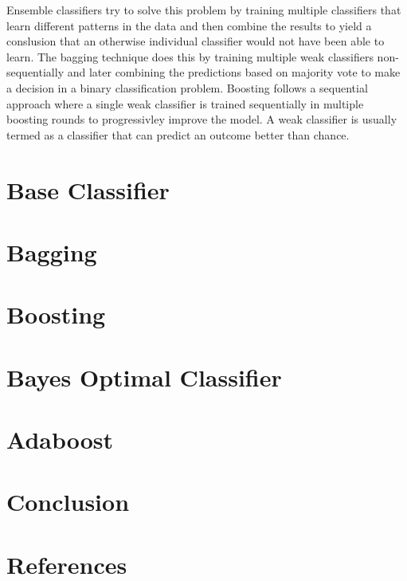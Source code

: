 \documentclass{acmtog} %
\begin{document}
Ensemble classifiers try to solve this problem by training multiple classifiers that learn different patterns in the data and then combine the results to yield a conslusion that an otherwise individual classifier would not have been able to learn. The bagging technique does this by training multiple weak classifiers non-sequentially and later combining the predictions based on majority vote to make a decision in a binary classification problem. Boosting follows a sequential approach where a single weak classifier is trained sequentially in multiple boosting rounds to progressivley improve the model. A weak classifier is usually termed as a classifier that can predict an outcome better than chance. 
\section{Base Classifier}

\section{Bagging}
\section{Boosting}
\section{Bayes Optimal Classifier}
\section{Adaboost}
\section{Conclusion}
\section{References}



\end{document}
